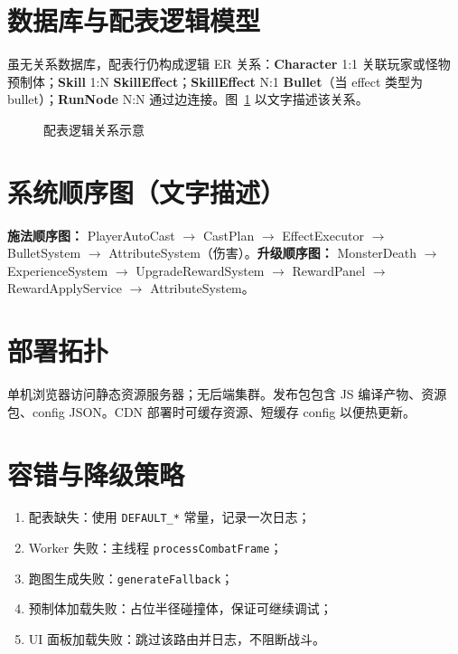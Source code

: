 ﻿
\section{数据库与配表逻辑模型}

虽无关系数据库，配表行仍构成逻辑 ER 关系：\textbf{Character} 1:1 关联玩家或怪物预制体；\textbf{Skill} 1:N \textbf{SkillEffect}；\textbf{SkillEffect} N:1 \textbf{Bullet}（当 effect 类型为 bullet）；\textbf{RunNode} N:N 通过边连接。图~\ref{fig:config-er} 以文字描述该关系。

\begin{figure}[htbp]
  \centering
  \caption{配表逻辑关系示意}
  \label{fig:config-er}
\end{figure}

\section{系统顺序图（文字描述）}

\textbf{施法顺序图：} PlayerAutoCast $\rightarrow$ CastPlan $\rightarrow$ EffectExecutor $\rightarrow$ BulletSystem $\rightarrow$ AttributeSystem（伤害）。\textbf{升级顺序图：} MonsterDeath $\rightarrow$ ExperienceSystem $\rightarrow$ UpgradeRewardSystem $\rightarrow$ RewardPanel $\rightarrow$ RewardApplyService $\rightarrow$ AttributeSystem。

\section{部署拓扑}

单机浏览器访问静态资源服务器；无后端集群。发布包包含 JS 编译产物、资源包、config JSON。CDN 部署时可缓存资源、短缓存 config 以便热更新\cite{gregory2018game}。

\section{容错与降级策略}

\begin{enumerate}[label=\arabic*.]
  \item 配表缺失：使用 \texttt{DEFAULT\_*} 常量，记录一次日志；
  \item Worker 失败：主线程 \texttt{processCombatFrame}；
  \item 跑图生成失败：\texttt{generateFallback}；
  \item 预制体加载失败：占位半径碰撞体，保证可继续调试；
  \item UI 面板加载失败：跳过该路由并日志，不阻断战斗。
\end{enumerate}

